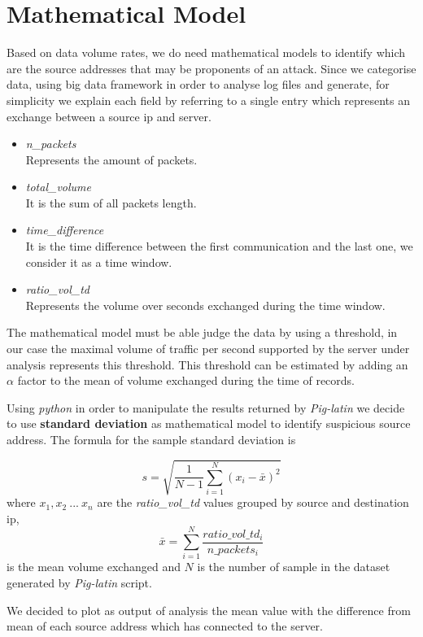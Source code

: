 \section{Mathematical Model}
Based on data volume rates, we do need mathematical models to identify which are the source addresses that may be proponents of an attack. Since we categorise data, using big data framework in order to analyse log files and generate, for simplicity we explain each field by referring to a single entry which represents an exchange between a source ip and server.

\begin{itemize}
	\item \textit{n\_packets} \\ Represents the amount of packets.
	\item \textit{total\_volume} \\ It is the sum of all packets length.
	\item \textit{time\_difference} \\ It is the time difference between the first communication and the last one, we consider it as a time window.
	\item \textit{ratio\_vol\_td} \\ Represents the volume over seconds exchanged during the time window.
\end{itemize}

The mathematical model must be able judge the data by using a threshold, in our case the maximal volume of traffic per second supported by the server under analysis represents this threshold.
This threshold can be estimated by adding an $\alpha$ factor to the mean of volume exchanged during the time of records.

Using \textit{python} in order to manipulate the results returned by \textit{Pig-latin} we decide to use \textbf{standard deviation} as mathematical model to identify suspicious source address.
The formula for the sample standard deviation is

\begin{equation}
\label{eq:standard_dev}
	s = \sqrt{\frac{1}{N-1}\sum_{i=1}^N(x_i - \bar{x})^2}
\end{equation}
where $x_1, x_2\ ...\ x_n$ are the \textit{ratio\_vol\_td} values grouped by source and destination ip, 
\begin{equation}
	\bar{x}= \sum_{i=1}^N \frac{ratio\_vol\_td_i}{n\_packets_i}
\end{equation}
is the mean volume exchanged and $N$ is the number of sample in the dataset generated by \textit{Pig-latin} script. 

We decided to plot as output of analysis the mean value with the difference from mean of each source address which has connected to the server.
